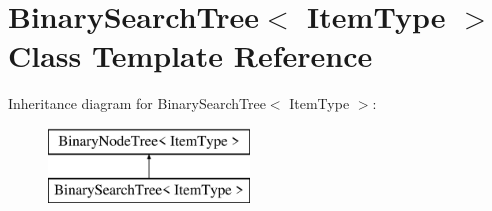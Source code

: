 \hypertarget{class_binary_search_tree}{}\section{Binary\+Search\+Tree$<$ Item\+Type $>$ Class Template Reference}
\label{class_binary_search_tree}
Inheritance diagram for Binary\+Search\+Tree$<$ Item\+Type $>$\+:\begin{figure}[H]
\begin{center}
\leavevmode
\includegraphics[height=2.000000cm]{class_binary_search_tree}
\end{center}
\end{figure}
